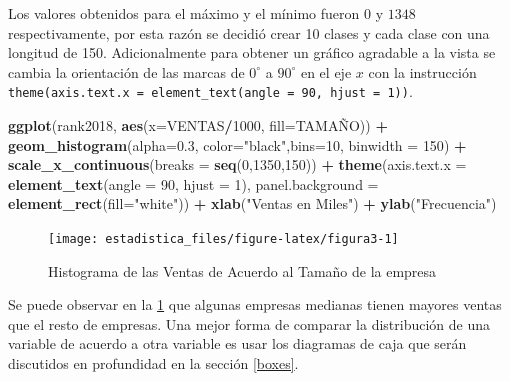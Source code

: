 \documentclass[]{book}
\newenvironment{Shaded}{\begin{snugshade}}{\end{snugshade}}
\newcommand{\DataTypeTok}[1]{\textcolor[rgb]{0.13,0.29,0.53}{#1}}
\newcommand{\DecValTok}[1]{\textcolor[rgb]{0.00,0.00,0.81}{#1}}
\newcommand{\FloatTok}[1]{\textcolor[rgb]{0.00,0.00,0.81}{#1}}
\newcommand{\KeywordTok}[1]{\textcolor[rgb]{0.13,0.29,0.53}{\textbf{#1}}}
\newcommand{\NormalTok}[1]{#1}
\newcommand{\OperatorTok}[1]{\textcolor[rgb]{0.81,0.36,0.00}{\textbf{#1}}}
\newcommand{\StringTok}[1]{\textcolor[rgb]{0.31,0.60,0.02}{#1}}
\begin{document}
Los valores obtenidos para el máximo y el mínimo fueron \(0\) y \(1348\) respectivamente, por esta razón se decidió crear 10 clases y cada clase con una longitud de 150. Adicionalmente para obtener un gráfico agradable a la vista se cambia la orientación de las marcas de \(0^\circ\) a \(90^\circ\) en el eje \(x\) con la instrucción \texttt{theme(axis.text.x\ =\ element\_text(angle\ =\ 90,\ hjust\ =\ 1))}.

\begin{Shaded}
\begin{Highlighting}[]
\KeywordTok{ggplot}\NormalTok{(rank2018, }\KeywordTok{aes}\NormalTok{(}\DataTypeTok{x=}\NormalTok{VENTAS}\OperatorTok{/}\DecValTok{1000}\NormalTok{, }\DataTypeTok{fill=}\NormalTok{TAMAÑO)) }\OperatorTok{+}\StringTok{ }
\StringTok{  }\KeywordTok{geom_histogram}\NormalTok{(}\DataTypeTok{alpha=}\FloatTok{0.3}\NormalTok{, }\DataTypeTok{color=}\StringTok{"black"}\NormalTok{,}\DataTypeTok{bins=}\DecValTok{10}\NormalTok{, }\DataTypeTok{binwidth =} \DecValTok{150}\NormalTok{) }\OperatorTok{+}
\StringTok{  }\KeywordTok{scale_x_continuous}\NormalTok{(}\DataTypeTok{breaks =} \KeywordTok{seq}\NormalTok{(}\DecValTok{0}\NormalTok{,}\DecValTok{1350}\NormalTok{,}\DecValTok{150}\NormalTok{)) }\OperatorTok{+}
\StringTok{  }\KeywordTok{theme}\NormalTok{(}\DataTypeTok{axis.text.x =} \KeywordTok{element_text}\NormalTok{(}\DataTypeTok{angle =} \DecValTok{90}\NormalTok{, }\DataTypeTok{hjust =} \DecValTok{1}\NormalTok{), }
        \DataTypeTok{panel.background =} \KeywordTok{element_rect}\NormalTok{(}\DataTypeTok{fill=}\StringTok{"white"}\NormalTok{)) }\OperatorTok{+}
\StringTok{  }\KeywordTok{xlab}\NormalTok{(}\StringTok{"Ventas en Miles"}\NormalTok{) }\OperatorTok{+}\StringTok{ }\KeywordTok{ylab}\NormalTok{(}\StringTok{"Frecuencia"}\NormalTok{) }
\end{Highlighting}
\end{Shaded}

\begin{figure}[h!]

{\centering \texttt{[image: estadistica\_files/figure-latex/figura3-1]} 

}

\caption{Histograma de las Ventas de Acuerdo al Tamaño de la empresa}\label{fig:figura3}
\end{figure}

Se puede observar en la \ref{fig:figura3} que algunas empresas medianas tienen mayores ventas que el resto de empresas. Una mejor forma de comparar la distribución de una variable de acuerdo a otra variable es usar los diagramas de caja que serán discutidos en profundidad en la sección \ref{boxes}.
\end{document}
